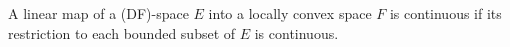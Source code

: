 A linear map of a (DF)-space $E$ into a locally convex space $F$ is continuous if its restriction to each bounded subset of $E$ is continuous.